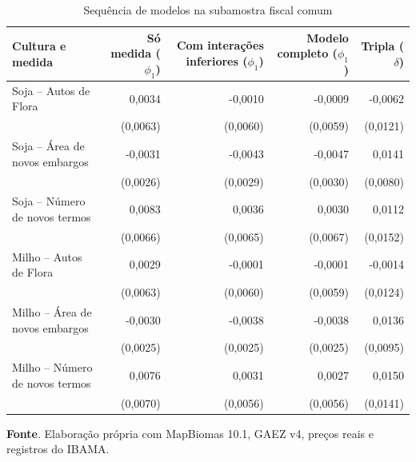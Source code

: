 \begin{table}[htbp]
\centering
\footnotesize
\setlength{\tabcolsep}{4pt}
\captionstyle{\centering}
\normalcaption
\caption{Sequência de modelos na subamostra fiscal comum}
\label{tab:ap-h1b-ponte-quali}
\begin{tabular}{lrrrr}
\toprule
Cultura e medida & \shortstack{Só medida\\($\phi_1$)} & \shortstack{Com interações\\inferiores ($\phi_1$)} & \shortstack{Modelo\\completo ($\phi_1$)} & \shortstack{Tripla\\($\delta$)} \\
\midrule
Soja -- Autos de Flora & 0,0034 & -0,0010 & -0,0009 & -0,0062 \\
 & (0,0063) & (0,0060) & (0,0059) & (0,0121) \\
Soja -- Área de novos embargos & -0,0031 & -0,0043 & -0,0047 & 0,0141 \\
 & (0,0026) & (0,0029) & (0,0030) & (0,0080) \\
Soja -- Número de novos termos & 0,0083 & 0,0036 & 0,0030 & 0,0112 \\
 & (0,0066) & (0,0065) & (0,0067) & (0,0152) \\
\addlinespace
Milho -- Autos de Flora & 0,0029 & -0,0001 & -0,0001 & -0,0014 \\
 & (0,0063) & (0,0060) & (0,0059) & (0,0124) \\
Milho -- Área de novos embargos & -0,0030 & -0,0038 & -0,0038 & 0,0136 \\
 & (0,0025) & (0,0025) & (0,0025) & (0,0095) \\
Milho -- Número de novos termos & 0,0076 & 0,0031 & 0,0027 & 0,0150 \\
 & (0,0070) & (0,0056) & (0,0056) & (0,0141) \\
\bottomrule
\end{tabular}
\par\smallskip\begin{minipage}{\textwidth}\footnotesize
\SingleSpacing
\noindent\textbf{Fonte}. Elaboração própria com MapBiomas 10.1, GAEZ v4, preços reais e registros do IBAMA.
\end{minipage}
\end{table}

\FloatBarrier

